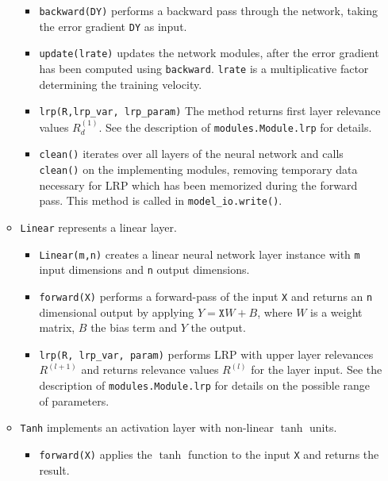 \documentclass[a4wide]{article}
\begin{document}
\begin{itemize}
\begin{itemize}
\begin{itemize}
				 \item \texttt{backward(DY)} performs a backward pass through the network, taking the error gradient \texttt{DY} as input.
				 \item \texttt{update(lrate)} updates the network modules, after the error gradient has been computed using \texttt{backward}. \texttt{lrate} is a multiplicative factor determining the training velocity.
				\item \texttt{lrp(R,lrp\_var, lrp\_param)}
				The method returns first layer relevance values $R_d^{(1)}$. See the description of  \texttt{modules.Module.lrp} for details.
				
				
				\item \texttt{clean()} iterates over all layers of the neural network and calls \texttt{clean()} on the implementing modules, removing temporary data necessary for LRP	which has been memorized during the forward pass. This method is called in \texttt{model\_io.write()}. 
			\end{itemize}
			
		\item \texttt{Linear} represents a linear layer.
			\begin{itemize}
				\item \texttt{Linear(m,n)} creates a linear neural network layer instance with \texttt{m} input dimensions and \texttt{n} output dimensions.
				
				\item \texttt{forward(X)} performs a forward-pass of the input \texttt{X} and returns an \texttt{n} dimensional output by applying $Y  = \texttt{X}W + B$, where $W$ is a weight matrix, $B$ the bias term and $Y$ the output.
								
				\item \texttt{lrp(R, lrp\_var, param)} performs LRP with upper layer relevances $R^{(l+1)}$ and returns relevance values $R^{(l)}$ for the layer input. See the description of \texttt{modules.Module.lrp} for details on the possible range of parameters.
				
			\end{itemize}
		\item \texttt{Tanh} implements an activation layer with non-linear $\tanh$ units.
			\begin{itemize}
				\item \texttt{forward(X)} applies the $\tanh$ function to the input \texttt{X} and returns the result.
			\end{itemize}	
				

\end{itemize}
\end{itemize}
\end{document}
